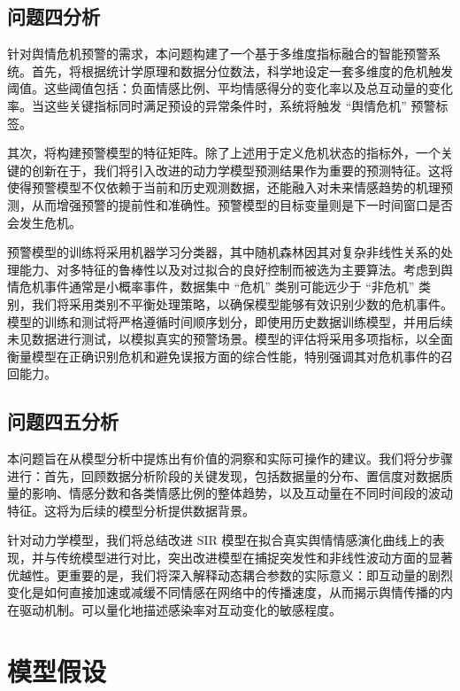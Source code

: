 \documentclass[withoutpreface,bwprint]{cumcmthesis}
\begin{document}
\subsection{问题四分析}

针对舆情危机预警的需求，本问题构建了一个基于多维度指标融合的智能预警系统。首先，将根据统计学原理和数据分位数法，科学地设定一套多维度的危机触发阈值。这些阈值包括：负面情感比例、平均情感得分的变化率以及总互动量的变化率。当这些关键指标同时满足预设的异常条件时，系统将触发 “舆情危机” 预警标签。

其次，将构建预警模型的特征矩阵。除了上述用于定义危机状态的指标外，一个关键的创新在于，我们将引入改进的动力学模型预测结果作为重要的预测特征。这将使得预警模型不仅依赖于当前和历史观测数据，还能融入对未来情感趋势的机理预测，从而增强预警的提前性和准确性。预警模型的目标变量则是下一时间窗口是否会发生危机。

预警模型的训练将采用机器学习分类器，其中随机森林因其对复杂非线性关系的处理能力、对多特征的鲁棒性以及对过拟合的良好控制而被选为主要算法。考虑到舆情危机事件通常是小概率事件，数据集中 “危机” 类别可能远少于 “非危机” 类别，我们将采用类别不平衡处理策略，以确保模型能够有效识别少数的危机事件。模型的训练和测试将严格遵循时间顺序划分，即使用历史数据训练模型，并用后续未见数据进行测试，以模拟真实的预警场景。模型的评估将采用多项指标，以全面衡量模型在正确识别危机和避免误报方面的综合性能，特别强调其对危机事件的召回能力。


\subsection{问题四五分析}

本问题旨在从模型分析中提炼出有价值的洞察和实际可操作的建议。我们将分步骤进行：首先，回顾数据分析阶段的关键发现，包括数据量的分布、置信度对数据质量的影响、情感分数和各类情感比例的整体趋势，以及互动量在不同时间段的波动特征。这将为后续的模型分析提供数据背景。

针对动力学模型，我们将总结改进 SIR 模型在拟合真实舆情情感演化曲线上的表现，并与传统模型进行对比，突出改进模型在捕捉突发性和非线性波动方面的显著优越性。更重要的是，我们将深入解释动态耦合参数的实际意义：即互动量的剧烈变化是如何直接加速或减缓不同情感在网络中的传播速度，从而揭示舆情传播的内在驱动机制。可以量化地描述感染率对互动变化的敏感程度。



\section{模型假设}
\end{document}
